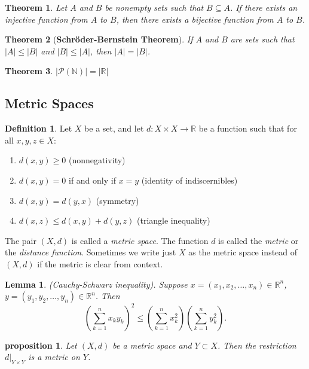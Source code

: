 \documentclass{article}
\newtheorem{theorem}{Theorem}[section]
\newtheorem{lemma}{Lemma}[section]
\newtheorem{proposition}{Proposition}[section]
\newtheorem{proposition}{proposition}[section]
\theoremstyle{definition}
\newtheorem{definition}{Definition}[section]
\theoremstyle{remark}
\begin{document}
\begin{theorem}
Let \( A \) and \( B \) be nonempty sets such that \( B \subseteq A \). If there exists an injective function from \( A \) to \( B \), then there exists a bijective function from \( A \) to \( B \).
\end{theorem}


\begin{theorem}[\textbf{Schröder-Bernstein Theorem}]
If \( A \) and \( B \) are sets such that \( |A| \leq |B| \) and \( |B| \leq |A| \), then \( |A| = |B| \).
\end{theorem}




\begin{theorem}
$|\mathcal{P}(\mathbb{N})| = |\mathbb{R}|$
\end{theorem}


\subsection{Metric Spaces}
\begin{definition} \label{def:metric_space}
Let \( X \) be a set, and let \( d: X \times X \to \mathbb{R} \) be a function such that for all \( x, y, z \in X \):
\begin{enumerate}
\item \( d(x,y) \geq 0 \) \hfill (nonnegativity)
\item \( d(x,y) = 0 \) if and only if \( x = y \) \hfill (identity of indiscernibles)
\item \( d(x,y) = d(y,x) \) \hfill (symmetry)
\item \( d(x,z) \leq d(x,y) + d(y,z) \) \hfill (triangle inequality)
\end{enumerate}
The pair \( (X, d) \) is called a \textit{metric space}. The function \( d \) is called the \textit{metric} or the \textit{distance function}. Sometimes we write just \( X \) as the metric space instead of \( (X, d) \) if the metric is clear from context.
\end{definition}

\begin{lemma} \label{lem:cauchy_schwarz}
(Cauchy-Schwarz inequality). Suppose \( x = (x_1, x_2, \dots, x_n) \in \mathbb{R}^n \), \( y = (y_1, y_2, \dots, y_n) \in \mathbb{R}^n \). Then
\[
\left( \sum_{k=1}^{n} x_k y_k \right)^2 \leq \left( \sum_{k=1}^{n} x_k^2 \right) \left( \sum_{k=1}^{n} y_k^2 \right).
\]
\end{lemma}

\begin{proposition} \label{prop:metric_restriction}
Let \( (X, d) \) be a metric space and \( Y \subset X \). Then the restriction \( d|_{Y \times Y} \) is a metric on \( Y \).
\end{proposition}
\end{document}

